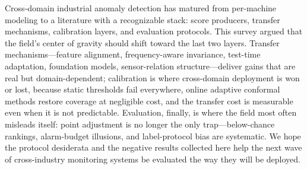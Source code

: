 Cross-domain industrial anomaly detection has matured from per-machine modeling to a literature with a recognizable stack: score producers, transfer mechanisms, calibration layers, and evaluation protocols. This survey argued that the field's center of gravity should shift toward the last two layers. Transfer mechanisms---feature alignment, frequency-aware invariance, test-time adaptation, foundation models, sensor-relation structure---deliver gains that are real but domain-dependent; calibration is where cross-domain deployment is won or lost, because static thresholds fail everywhere, online adaptive conformal methods restore coverage at negligible cost, and the transfer cost is measurable even when it is not predictable. Evaluation, finally, is where the field most often misleads itself: point adjustment is no longer the only trap---below-chance rankings, alarm-budget illusions, and label-protocol bias are systematic. We hope the protocol desiderata and the negative results collected here help the next wave of cross-industry monitoring systems be evaluated the way they will be deployed.
